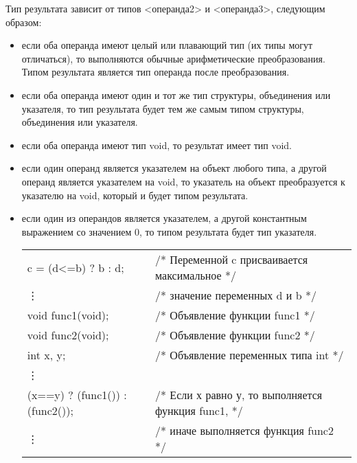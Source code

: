 Тип результата зависит от типов <операнда2> и <операнда3>, следующим образом: 
\begin{itemize}
\item если оба операнда имеют целый или плавающий тип (их типы могут отличаться), то выполняются обычные арифметические преобразования. Типом результата является тип операнда после преобразования. 
\item  если оба операнда имеют один и тот же тип структуры, объединения или указателя, то тип результата будет тем же самым типом структуры, объединения или указателя. 
\item если оба операнда имеют тип void, то результат имеет тип void. 
\item если один операнд является указателем на объект любого типа, а другой операнд является указателем на void, то указатель на объект преобразуется к указателю на void, который и будет типом результата.  
\item если один из операндов является указателем, а другой константным выражением со значением 0, то типом результата будет тип указателя. \killoverfullbefore \BL

\begin{pExample}
\begin{tabular}{ l l }
c = (d<=b) ? b : d; & \textcolor{exComm}{/* Переменной c присваивается максимальное */} \\
\vdots & \textcolor{exComm}{/* значение переменных d и b */} \\
void func1(void); & \textcolor{exComm}{/* Объявление функции func1 */} \\  
void func2(void); & \textcolor{exComm}{/* Объявление функции func2  */} \\
int x, y; & \textcolor{exComm}{/* Объявление переменных типа int  */} \\
\vdots & \textcolor{exComm}{ } \\
(x==y) ? (func1()) : (func2()); & \textcolor{exComm}{/* Если х равно у, то выполняется функция func1,   */} \\
\vdots & \textcolor{exComm}{/* иначе выполняется  функция func2   */} \\
\end{tabular}
\end{pExample}
\end{itemize}

